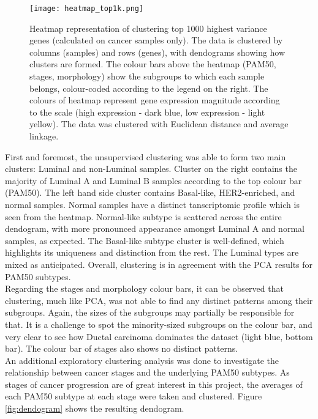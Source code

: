             \begin{figure}[!h]
            \centering
            \texttt{[image: heatmap\_top1k.png]}
            \caption{Heatmap representation of clustering top 1000 highest variance genes (calculated on cancer samples only). The data is clustered by columns (samples) and rows (genes), with dendograms showing how clusters are formed. The colour bars above the heatmap (PAM50, stages, morphology) show the subgroups to which each sample belongs, colour-coded according to the legend on the right. The colours of heatmap represent gene expression magnitude according to the scale (high expression - dark blue, low expression - light yellow). The data was clustered with Euclidean distance and average linkage. }
            \label{fig:heatmap1k}
            \end{figure}
    \newpage
    First and foremost, the unsupervised clustering was able to form two main clusters: Luminal and non-Luminal samples. Cluster on the right contains the majority of Luminal A and Luminal B samples according to the top colour bar (PAM50). The left hand side cluster contains Basal-like, HER2-enriched, and normal samples. Normal samples have a distinct tanscriptomic profile which is seen from the heatmap. Normal-like subtype is scattered across the entire dendogram, with more pronounced appearance amongst Luminal A and normal samples, as expected. The Basal-like subtype cluster is well-defined, which highlights its uniqueness and distinction from the rest. The Luminal types are mixed as anticipated. Overall, clustering is in agreement with the PCA results for PAM50 subtypes. \\    
    Regarding the stages and morphology colour bars, it can be observed that clustering, much like PCA, was not able to find any distinct patterns among their subgroups. Again, the sizes of the subgroups may partially be responsible for that. It is a challenge to spot the minority-sized subgroups on the colour bar, and very clear to see how Ductal carcinoma dominates the dataset (light blue, bottom bar). The colour bar of stages also shows no distinct patterns. \\
    
    An additional exploratory clustering analysis was done to investigate the relationship between cancer stages and the underlying PAM50 subtypes. As stages of cancer progression are of great interest in this project, the averages of each PAM50 subtype at each stage were taken and clustered. Figure \ref{fig:dendogram} shows the resulting dendogram. 
    
